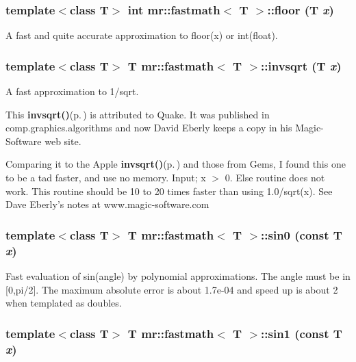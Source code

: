 \subsubsection{\setlength{\rightskip}{0pt plus 5cm}template$<$class T$>$ int {\bf mr::fastmath}$<$ T $>$::floor (T {\em x})\hspace{0.3cm}{\tt  [inline, static]}}\label{classmr_1_1fastmath_e11}


A fast and quite accurate approximation to floor(x) or int(float). 

\subsubsection{\setlength{\rightskip}{0pt plus 5cm}template$<$class T$>$ T {\bf mr::fastmath}$<$ T $>$::invsqrt (T {\em x})\hspace{0.3cm}{\tt  [inline, static]}}\label{classmr_1_1fastmath_e10}


A fast approximation to 1/sqrt. 

This {\bf invsqrt()}{\rm (p.\,\pageref{classmr_1_1fastmath_e10})} is attributed to Quake. It was published in comp.graphics.algorithms and now David Eberly keeps a copy in his Magic-Software web site.

Comparing it to the Apple {\bf invsqrt()}{\rm (p.\,\pageref{classmr_1_1fastmath_e10})} and those from Gems, I found this one to be a tad faster, and use no memory. Input; x $>$ 0. Else routine does not work. This routine should be 10 to 20 times faster than using 1.0/sqrt(x). See Dave Eberly's notes at www.magic-software.com 
\subsubsection{\setlength{\rightskip}{0pt plus 5cm}template$<$class T$>$ T {\bf mr::fastmath}$<$ T $>$::sin0 (const T {\em x})\hspace{0.3cm}{\tt  [inline, static]}}\label{classmr_1_1fastmath_e0}


Fast evaluation of sin(angle) by polynomial approximations. The angle must be in [0,pi/2]. The maximum absolute error is about 1.7e-04 and speed up is about 2 when templated as doubles. 
\subsubsection{\setlength{\rightskip}{0pt plus 5cm}template$<$class T$>$ T {\bf mr::fastmath}$<$ T $>$::sin1 (const T {\em x})\hspace{0.3cm}{\tt  [inline, static]}}\label{classmr_1_1fastmath_e1}


